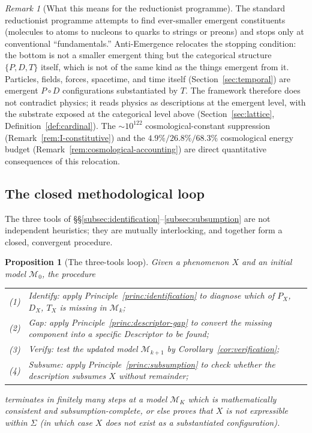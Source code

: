 \documentclass[11pt,a4paper]{article}
\newtheorem{proposition}[theorem]{Proposition}
\theoremstyle{definition}
\theoremstyle{remark}
\newtheorem{remark}[theorem]{Remark}
\begin{document}
\begin{remark}[What this means for the reductionist programme]\label{rem:reductionism-inversion}
The standard reductionist programme attempts to find ever-smaller emergent constituents (molecules to atoms to nucleons to quarks to strings or preons) and stops only at conventional ``fundamentals.'' Anti-Emergence relocates the stopping condition: the bottom is not a smaller emergent thing but the categorical structure $\{P,D,T\}$ itself, which is not of the same kind as the things emergent from it. Particles, fields, forces, spacetime, and time itself (Section~\ref{sec:temporal}) are emergent $P\circ D$ configurations substantiated by $T$. The framework therefore does not contradict physics; it reads physics as descriptions at the emergent level, with the substrate exposed at the categorical level above (Section~\ref{sec:lattice}, Definition~\ref{def:cardinal}). The $\sim 10^{122}$ cosmological-constant suppression (Remark~\ref{rem:I-constitutive}) and the $4.9\%/26.8\%/68.3\%$ cosmological energy budget (Remark~\ref{rem:cosmological-accounting}) are direct quantitative consequences of this relocation.
\end{remark}

\subsection{The closed methodological loop}\label{subsec:loop}

The three tools of \S\S\ref{subsec:identification}--\ref{subsec:subsumption} are not independent heuristics; they are mutually interlocking, and together form a closed, convergent procedure.

\begin{proposition}[The three-tools loop]\label{prop:loop}
Given a phenomenon $X$ and an initial model $\mathcal{M}_{0}$, the procedure
\begin{center}
\begin{tabularx}{\textwidth}{rX}
(1) & Identify: apply Principle~\ref{princ:identification} to diagnose which of $P_{X}$, $D_{X}$, $T_{X}$ is missing in $\mathcal{M}_{k}$;\\
(2) & Gap: apply Principle~\ref{princ:descriptor-gap} to convert the missing component into a specific Descriptor to be found;\\
(3) & Verify: test the updated model $\mathcal{M}_{k+1}$ by Corollary~\ref{cor:verification};\\
(4) & Subsume: apply Principle~\ref{princ:subsumption} to check whether the description subsumes $X$ without remainder;
\end{tabularx}
\end{center}
terminates in finitely many steps at a model $\mathcal{M}_{K}$ which is mathematically consistent and subsumption-complete, or else proves that $X$ is not expressible within $\Sigma$ (in which case $X$ does not exist as a substantiated configuration).
\end{proposition}
\end{document}
